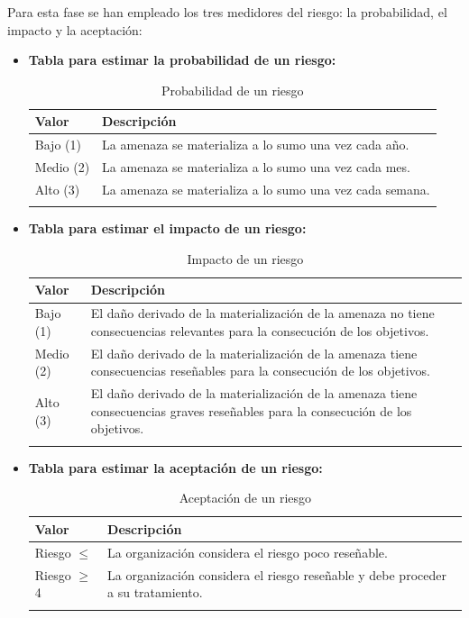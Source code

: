 \begin{enumerate}
Para esta fase se han empleado los tres medidores del riesgo: la probabilidad, el impacto y la aceptación: 

\begin{itemize}

\item{\textbf{Tabla para estimar la probabilidad de un riesgo:}}
\begingroup
\renewcommand\arraystretch{1.3}
\begin{longtable}{l p{13cm}}
\hline
\textbf{Valor} & \textbf{Descripción} \\
\hline
\endhead
\endfoot
Bajo (1) & 
La amenaza se materializa a lo sumo una vez cada año. 
 \\
Medio (2) & 
La amenaza se materializa a lo sumo una vez cada mes.
 \\
Alto (3) & 
La amenaza se materializa a lo sumo una vez cada semana.
 \\
\hline
\caption{Probabilidad de un riesgo}\label{prob_riesgo}\\
\end{longtable}

\item{\textbf{Tabla para estimar el impacto de un riesgo:}}
\begin{longtable}{l p{13cm}}
\hline
\textbf{Valor} & \textbf{Descripción} \\
\hline
\endhead
\endfoot
Bajo (1) & 
El daño derivado de la materialización de la amenaza no tiene consecuencias relevantes para la consecución de los objetivos.  
 \\
Medio (2) & 
El daño derivado de la materialización de la amenaza tiene consecuencias reseñables para la consecución de los objetivos.
 \\
Alto (3) & 
El daño derivado de la materialización de la amenaza tiene consecuencias graves reseñables para la consecución de los objetivos.
 \\
\hline
\caption{Impacto de un riesgo}\label{impacto_riesgo}\\
\end{longtable}

\item{\textbf{Tabla para estimar la aceptación de un riesgo:}}
\begin{longtable}{l p{13cm}}
\hline
\textbf{Valor} & \textbf{Descripción} \\
\hline
\endhead
\endfoot
Riesgo $\leq$ & 
La organización considera el riesgo poco reseñable. 
 \\
Riesgo $\geq$ 4 & 
La organización considera el riesgo reseñable y debe proceder a su tratamiento.
 \\
\hline
\caption{Aceptación de un riesgo}\label{aceptacion_riesgo}\\
\end{longtable}


\end{itemize}
\end{enumerate}
